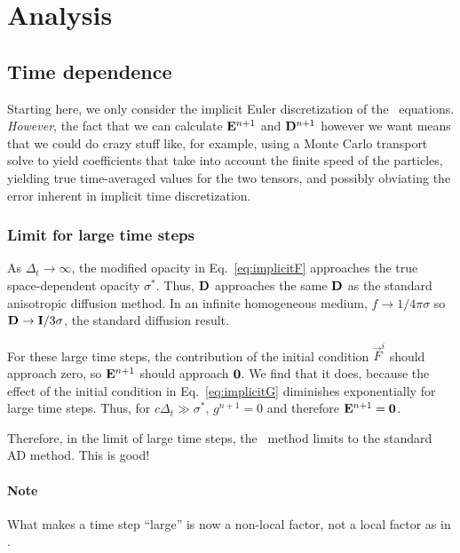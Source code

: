 \section{Analysis}


\subsection{Time dependence}
Starting here, we only consider the implicit Euler discretization of the
\APone\ equations. \emph{However}, the fact that we can calculate
$\mathbf{E}^{n+1}$ and $\mathbf{D}^{n+1}$ however we want means that we could do crazy
stuff like, for example, using a Monte Carlo transport solve to yield
coefficients that take into account the finite speed of the particles, yielding
true time-averaged values for the two tensors, and possibly obviating the error
inherent in implicit time discretization.

\subsubsection{Limit for large time steps}
As $\Delta_t\to \infty$, the modified opacity in Eq.~\eqref{eq:implicitF}
approaches the true space-dependent opacity $\sigma^\ast$. Thus, $\mathbf{D}$
approaches the same $\mathbf{D}$ as the standard anisotropic diffusion method. In
an infinite homogeneous medium, $f\to 1/4\pi \sigma$ so $\mathbf{D} \to
\mathbf{I}/3\sigma$, the standard diffusion result.

For these large time steps, the contribution of the initial condition
$\vec{F}^i$ should approach zero, so $\mathbf{E}^{n+1}$ should approach $
\mathbf{0}$. We find that it does, because the effect of the initial condition
in Eq.~\eqref{eq:implicitG} diminishes exponentially for large time steps. Thus,
for $c \Delta_t \gg \sigma^\ast$, $g^{n+1}=0$ and therefore
$\mathbf{E}^{n+1}=\mathbf{0}$.

Therefore, in the limit of large time steps, the \APone\ method limits to the
standard AD method. This is good!

\paragraph{Note} What makes a time step ``large'' is now a non-local factor,
not a local factor as in \Pone.

